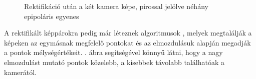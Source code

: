 \begin{figure}[tbh]
  \centering
{}
  \caption{Rektifikáció után a két kamera képe, pirossal jelölve néhány epipoláris egyenes \label{fig:stereo-calibration-after}}
\end{figure}

A rektifikált képpárokra pedig már léteznek algoritmusok \cite{SGBM, stereo-var}, melyek megtalálják a képeken az egymásnak megfelelő pontokat és az elmozdulásuk alapján megadják a pontok mélységértékeit. . ábra segítségével könnyű látni, hogy a nagy elmozdulást mutató pontok közelebb, a kisebbek távolabb találhatóak a kamerától.

